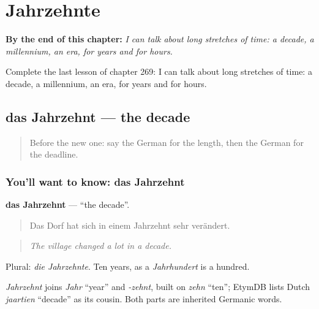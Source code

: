 
\chapter{Jahrzehnte}
\label{ch:ge-jahrzehnte}

\begin{chapteropening}
\textbf{By the end of this chapter:} \emph{I can talk about long stretches of time: a decade, a millennium, an era, for years and for hours.}

Complete the last lesson of chapter 269: I can talk about long stretches of time: a decade, a millennium, an era, for years and for hours.
\end{chapteropening}

\section[das Jahrzehnt]{das Jahrzehnt — the decade}

\label{lesson:GE-C269-jahrzehnt}



\begin{quote}
Before the new one: say the German for the length, then the German for the deadline.
\end{quote}

\subsection*{You'll want to know: das Jahrzehnt}
\textbf{das Jahrzehnt} — \textquotedblleft{}the decade\textquotedblright{}.

\begin{quote}
Das Dorf hat sich in einem Jahrzehnt sehr verändert.
\end{quote}

\begin{quote}
\emph{The village changed a lot in a decade.}
\end{quote}

Plural: \emph{die Jahrzehnte}. Ten years, as a \emph{Jahrhundert} is a hundred.

\begin{cousinweb}
\emph{Jahrzehnt} joins \emph{Jahr} \textquotedblleft{}year\textquotedblright{} and \emph{-zehnt}, built on \emph{zehn} \textquotedblleft{}ten\textquotedblright{}; EtymDB lists Dutch \emph{jaartien} \textquotedblleft{}decade\textquotedblright{} as its cousin. Both parts are inherited Germanic words.
\end{cousinweb}

